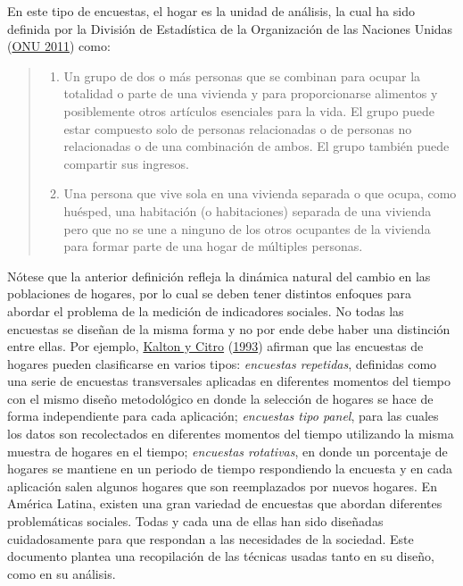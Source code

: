 \documentclass[
  12pt,
  spanish,
]{book}
\providecommand{\tightlist}{%
  \setlength{\itemsep}{0pt}\setlength{\parskip}{0pt}}
\begin{document}
En este tipo de encuestas, el hogar es la unidad de análisis, la cual ha sido definida por la División de Estadística de la Organización de las Naciones Unidas (\protect\hyperlink{ref-United-Nations_2011}{ONU 2011}) como:

\begin{quote}
\begin{enumerate}
\def\labelenumi{\alph{enumi}.}
\tightlist
\item
  Un grupo de dos o más personas que se combinan para ocupar la totalidad o parte de una vivienda y para proporcionarse alimentos y posiblemente otros artículos esenciales para la vida. El grupo puede estar compuesto solo de personas relacionadas o de personas no relacionadas o de una combinación de ambos. El grupo también puede compartir sus ingresos.
\item
  Una persona que vive sola en una vivienda separada o que ocupa, como huésped, una habitación (o habitaciones) separada de una vivienda pero que no se une a ninguno de los otros ocupantes de la vivienda para formar parte de una hogar de múltiples personas.
\end{enumerate}
\end{quote}

Nótese que la anterior definición refleja la dinámica natural del cambio en las poblaciones de hogares, por lo cual se deben tener distintos enfoques para abordar el problema de la medición de indicadores sociales. No todas las encuestas se diseñan de la misma forma y no por ende debe haber una distinción entre ellas. Por ejemplo, \protect\hyperlink{ref-Kalton_Citro_1993}{Kalton y Citro} (\protect\hyperlink{ref-Kalton_Citro_1993}{1993}) afirman que las encuestas de hogares pueden clasificarse en varios tipos: \emph{encuestas repetidas}, definidas como una serie de encuestas transversales aplicadas en diferentes momentos del tiempo con el mismo diseño metodológico en donde la selección de hogares se hace de forma independiente para cada aplicación; \emph{encuestas tipo panel}, para las cuales los datos son recolectados en diferentes momentos del tiempo utilizando la misma muestra de hogares en el tiempo; \emph{encuestas rotativas}, en donde un porcentaje de hogares se mantiene en un periodo de tiempo respondiendo la encuesta y en cada aplicación salen algunos hogares que son reemplazados por nuevos hogares. En América Latina, existen una gran variedad de encuestas que abordan diferentes problemáticas sociales. Todas y cada una de ellas han sido diseñadas cuidadosamente para que respondan a las necesidades de la sociedad. Este documento plantea una recopilación de las técnicas usadas tanto en su diseño, como en su análisis.
\end{document}
